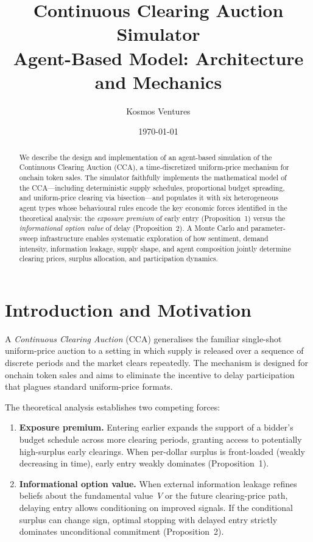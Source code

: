 \documentclass[11pt,a4paper]{article}
\title{\textbf{Continuous Clearing Auction Simulator}\\[4pt]
       \large Agent-Based Model: Architecture and Mechanics}
\author{Kosmos Ventures}
\date{\today}
\begin{document}
\maketitle

\begin{abstract}
We describe the design and implementation of an agent-based simulation of the Continuous Clearing Auction (CCA), a time-discretized uniform-price mechanism for onchain token sales.
The simulator faithfully implements the mathematical model of the CCA—including deterministic supply schedules, proportional budget spreading, and uniform-price clearing via bisection—and populates it with six heterogeneous agent types whose behavioural rules encode the key economic forces identified in the theoretical analysis: the \emph{exposure premium} of early entry (Proposition~1) versus the \emph{informational option value} of delay (Proposition~2).
A Monte Carlo and parameter-sweep infrastructure enables systematic exploration of how sentiment, demand intensity, information leakage, supply shape, and agent composition jointly determine clearing prices, surplus allocation, and participation dynamics.
\end{abstract}

\tableofcontents
\newpage

\section{Introduction and Motivation}
\label{sec:intro}

A \emph{Continuous Clearing Auction} (CCA) generalises the familiar single-shot uniform-price auction to a setting in which supply is released over a sequence of discrete periods and the market clears repeatedly. The mechanism is designed for onchain token sales and aims to eliminate the incentive to delay participation that plagues standard uniform-price formats.

The theoretical analysis establishes two competing forces:
\begin{enumerate}[label=(\roman*)]
  \item \textbf{Exposure premium.}  Entering earlier expands the support of a bidder's budget schedule across more clearing periods, granting access to potentially high-surplus early clearings.  When per-dollar surplus is front-loaded (weakly decreasing in time), early entry weakly dominates (Proposition~1).
  \item \textbf{Informational option value.}  When external information leakage refines beliefs about the fundamental value~$V$ or the future clearing-price path, delaying entry allows conditioning on improved signals.  If the conditional surplus can change sign, optimal stopping with delayed entry strictly dominates unconditional commitment (Proposition~2).
\end{enumerate}
\end{document}

